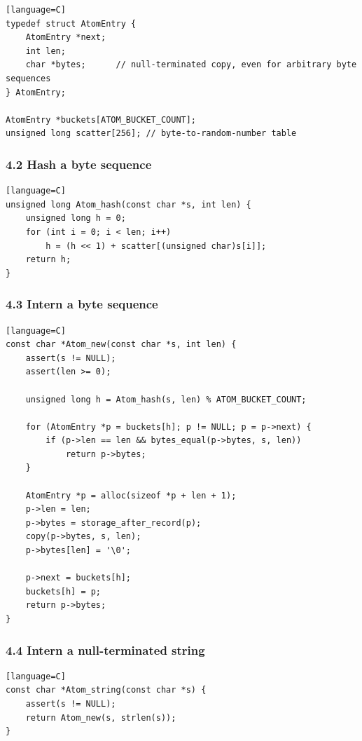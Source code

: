 \documentclass[11pt]{article}
\begin{document}
\begin{verbatim}[language=C]
typedef struct AtomEntry {
    AtomEntry *next;
    int len;
    char *bytes;      // null-terminated copy, even for arbitrary byte sequences
} AtomEntry;

AtomEntry *buckets[ATOM_BUCKET_COUNT];
unsigned long scatter[256]; // byte-to-random-number table
\end{verbatim}

\subsubsection{4.2 Hash a byte sequence}\label{hash-a-byte-sequence}

\begin{verbatim}[language=C]
unsigned long Atom_hash(const char *s, int len) {
    unsigned long h = 0;
    for (int i = 0; i < len; i++)
        h = (h << 1) + scatter[(unsigned char)s[i]];
    return h;
}
\end{verbatim}

\subsubsection{4.3 Intern a byte sequence}\label{intern-a-byte-sequence}

\begin{verbatim}[language=C]
const char *Atom_new(const char *s, int len) {
    assert(s != NULL);
    assert(len >= 0);

    unsigned long h = Atom_hash(s, len) % ATOM_BUCKET_COUNT;

    for (AtomEntry *p = buckets[h]; p != NULL; p = p->next) {
        if (p->len == len && bytes_equal(p->bytes, s, len))
            return p->bytes;
    }

    AtomEntry *p = alloc(sizeof *p + len + 1);
    p->len = len;
    p->bytes = storage_after_record(p);
    copy(p->bytes, s, len);
    p->bytes[len] = '\0';

    p->next = buckets[h];
    buckets[h] = p;
    return p->bytes;
}
\end{verbatim}

\subsubsection{4.4 Intern a null-terminated string}\label{intern-a-null-terminated-string}

\begin{verbatim}[language=C]
const char *Atom_string(const char *s) {
    assert(s != NULL);
    return Atom_new(s, strlen(s));
}
\end{verbatim}
\end{document}
